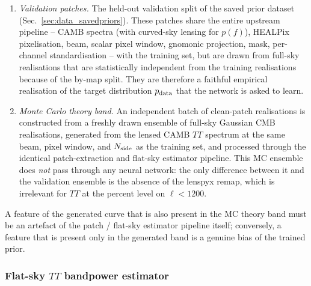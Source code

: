 \documentclass[11pt]{article}
\newcommand{\pdata}{p_{\rm data}}
\theoremstyle{definition}
\begin{document}
\begin{enumerate}[leftmargin=2.0em,itemsep=0.15em]
  \item \emph{Validation patches.} The held-out validation split of the saved prior dataset (Sec.~\ref{sec:data_savedpriors}). These patches share the entire upstream pipeline -- CAMB spectra (with curved-sky lensing for $p(f)$), HEALPix pixelisation, beam, scalar pixel window, gnomonic projection, mask, per-channel standardisation -- with the training set, but are drawn from full-sky realisations that are statistically independent from the training realisations because of the by-map split. They are therefore a faithful empirical realisation of the target distribution $\pdata$ that the network is asked to learn.
  \item \emph{Monte Carlo theory band.} An independent batch of clean-patch realisations is constructed from a freshly drawn ensemble of full-sky Gaussian CMB realisations, generated from the lensed CAMB $TT$ spectrum at the same beam, pixel window, and $N_{\rm side}$ as the training set, and processed through the identical patch-extraction and flat-sky estimator pipeline. This MC ensemble does \emph{not} pass through any neural network: the only difference between it and the validation ensemble is the absence of the lenspyx remap, which is irrelevant for $TT$ at the percent level on $\ell\!<\!1200$.
\end{enumerate}
A feature of the generated curve that is also present in the MC theory band must be an artefact of the patch / flat-sky estimator pipeline itself; conversely, a feature that is present only in the generated band is a genuine bias of the trained prior.
\subsubsection{\texorpdfstring{Flat-sky $TT$ bandpower estimator}{Flat-sky TT bandpower estimator}}
\label{sec:fm_diag_estimator}
\end{document}
